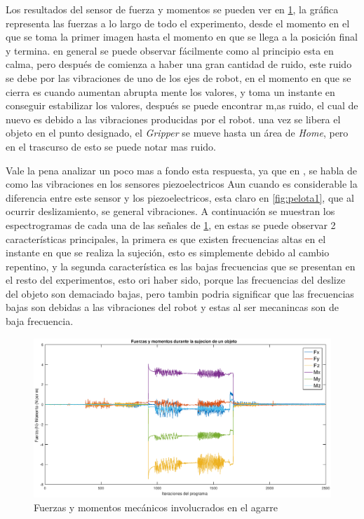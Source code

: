 \clearpage



Los resultados del sensor de fuerza y momentos se pueden ver en  \cref{fig:twist1}, la gráfica representa las fuerzas a lo largo de todo el experimento, desde el momento en el que se toma la primer imagen hasta el momento en que se llega a la posición final y termina. en general se puede observar fácilmente como al principio esta en calma, pero después de comienza a haber una gran cantidad de ruido, este ruido  se debe por las vibraciones de uno de los ejes de robot, en el momento en que se cierra es cuando aumentan abrupta mente los valores, y toma un instante en conseguir estabilizar los valores, después se puede encontrar m,as ruido, el cual de nuevo es debido a las vibraciones producidas por el robot.
una vez se libera el objeto en el punto designado, el \textit{Gripper} se mueve hasta un área de \textit{Home}, pero en el trascurso de esto se puede notar mas ruido.

Vale la pena analizar un poco mas a fondo esta respuesta, ya que en \cite{keylist}, se habla de como las vibraciones en los sensores piezoelectricos 
Aun cuando es considerable la diferencia entre este sensor y los piezoelectricos, esta claro en \cref{fig:pelota1}, que al ocurrir deslizamiento, se general vibraciones.
A continuación se muestran los espectrogramas de cada una de las señales de \cref{fig:twist1}, en estas se puede observar 2 características principales, la primera es que existen frecuencias altas en el instante en que se realiza la sujeción, esto es simplemente debido al cambio repentino, y la segunda característica es las bajas frecuencias que se presentan en el resto del experimentos, esto ori haber sido, porque las frecuencias del deslize del objeto son demaciado bajas, pero tambin podria significar que las frecuencias bajas son debidas a las vibraciones del robot y estas al ser mecanincas son de baja frecuencia.










\begin{figure}
	\centering
	\includegraphics[width=1\linewidth]{visio/graficasderesultados/twist1}
	\caption{Fuerzas y momentos mecánicos involucrados en el agarre}
	\label{fig:twist1}
\end{figure}


